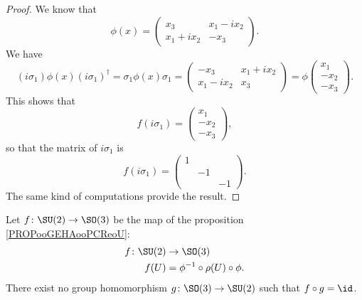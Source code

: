\begin{proof}
	We know that
	\begin{equation}
		\phi(x)=\begin{pmatrix}
			x_3      & x_1-ix_2 \\
			x_1+ix_2 & -x_3
		\end{pmatrix}.
	\end{equation}
	We have
	\begin{equation}
		(i\sigma_1)\phi(x)(i\sigma_1)^{\dag}=\sigma_1\phi(x)\sigma_1=\begin{pmatrix}
			-x_3     & x_1+ix_2 \\
			x_1-ix_2 & x_3
		\end{pmatrix}=\phi\begin{pmatrix}
			x_1  \\
			-x_2 \\
			-x_3
		\end{pmatrix}.
	\end{equation}
	This shows that
	\begin{equation}
		f(i\sigma_1)=\begin{pmatrix}
			x_1  \\
			-x_2 \\
			-x_3
		\end{pmatrix},
	\end{equation}
	so that the matrix of \( i\sigma_1\) is
	\begin{equation}
		f(i\sigma_1)=\begin{pmatrix}
			1 &    &    \\
			  & -1 &    \\
			  &    & -1
		\end{pmatrix}.
	\end{equation}
	The same kind of computations provide the result.
\end{proof}

\begin{proposition}
	Let \( f\colon \SU(2)\to \SO(3)\) be the map of the proposition \ref{PROPooGEHAooPCReoU}:
	\begin{equation}
		\begin{aligned}
			f\colon \SU(2) & \to \SO(3)                        \\
			f(U)           & =\phi^{-1}\circ\rho(U)\circ \phi.
		\end{aligned}
	\end{equation}
	There exist no group homomorphism \( g\colon \SO(3)\to \SU(2)\) such that \( f\circ g=\id\).
\end{proposition}

